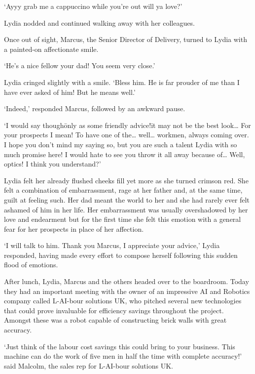 `Ayyy grab me a cappuccino while you're out will ya love?'

Lydia nodded and continued walking away with her colleagues.

Once out of sight, Marcus, the Senior Director of Delivery, turned to
Lydia with a painted-on affectionate smile.

`He's a nice fellow your dad! You seem very close.'

Lydia cringed slightly with a smile. `Bless him. He is far prouder of
me than I have ever asked of him! But he means well.'

`Indeed,' responded Marcus, followed by an awkward pause.

`I would say though\=only as some friendly advice!\=it may not be
the best look… For your prospects I mean! To have one of the… well…
workmen, always coming over. I hope you don't mind my saying so,
but you are such a talent Lydia with so much promise here! I would
hate to see you throw it all away because of… Well, optics! I 
think you understand?' 

Lydia felt her already flushed cheeks fill yet more as she turned
crimson red. She felt a combination of embarrassment, rage at her
father and, at the same time, guilt at feeling such. Her dad meant the
world to her and she had rarely ever felt ashamed of him in her
life. Her embarrassment was usually overshadowed by her love and
endearment but for the first time she felt this emotion with a general
fear for her prospects in place of her affection.

`I will talk to him. Thank you Marcus, I appreciate your advice,'
Lydia responded, having made every effort to compose herself following
this sudden flood of emotions.

After lunch, Lydia, Marcus and the others headed over to the
boardroom. Today they had an important meeting with the owner of an
impressive AI and Robotics company called L-AI-bour solutions UK,
who pitched several new technologies that could prove invaluable
for efficiency savings throughout the project. %
Amongst these was a robot capable of constructing brick walls with
great accuracy.

`Just think of the labour cost savings this could bring to your
business. This machine can do the work of five men in half the time
with complete accuracy!' said Malcolm, the sales rep for L-AI-bour
solutions UK.

